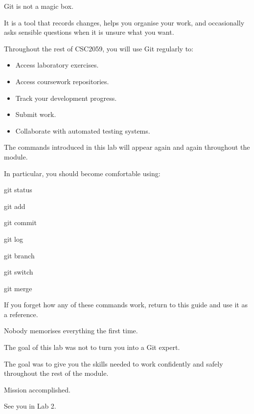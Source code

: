 \documentclass{csc2059practical}
\begin{document}
Git is not a magic box.

It is a tool that records changes, helps you organise your work, and occasionally asks sensible questions when it is unsure what you want.

Throughout the rest of CSC2059, you will use Git regularly to:

\begin{itemize}
  \item Access laboratory exercises.
  \item Access coursework repositories.
  \item Track your development progress.
  \item Submit work.
  \item Collaborate with automated testing systems.
\end{itemize}
The commands introduced in this lab will appear again and again throughout the module.

In particular, you should become comfortable using:

\begin{terminalplain}
git status
\end{terminalplain}
\begin{terminalplain}
git add
\end{terminalplain}
\begin{terminalplain}
git commit
\end{terminalplain}
\begin{terminalplain}
git log
\end{terminalplain}
\begin{terminalplain}
git branch
\end{terminalplain}
\begin{terminalplain}
git switch
\end{terminalplain}
\begin{terminalplain}
git merge
\end{terminalplain}
If you forget how any of these commands work, return to this guide and use it as a reference.

Nobody memorises everything the first time.

The goal of this lab was not to turn you into a Git expert.

The goal was to give you the skills needed to work confidently and safely throughout the rest of the module.

Mission accomplished.

See you in Lab 2.
\end{document}
